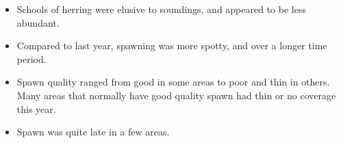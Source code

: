\begin{itemize}
\item Schools of herring were elusive to soundings, and appeared to be less abundant.
\item Compared to last year, spawning was more spotty, and over a longer time period.
\item Spawn quality ranged from good in some areas to poor and thin in others.
Many areas that normally have good quality spawn had thin or no coverage this year.
\item Spawn was quite late in a few areas.
\end{itemize}